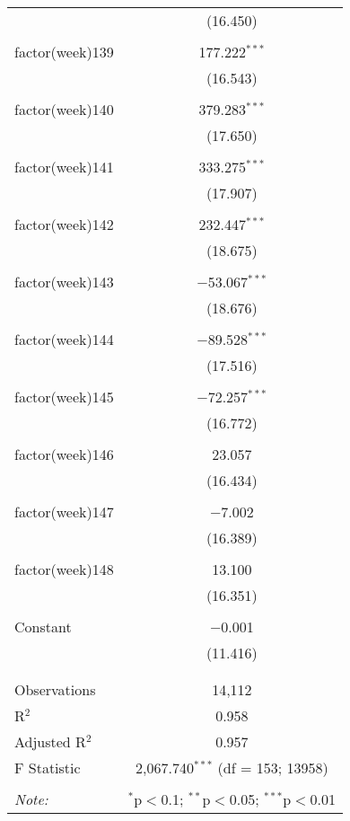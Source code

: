 \documentclass{article}
\begin{document}
\begin{table}[!htbp]
\begin{tabular}{@{\extracolsep{5pt}}lc}
  & (16.450) \\ 
  & \\ 
 factor(week)139 & 177.222$^{***}$ \\ 
  & (16.543) \\ 
  & \\ 
 factor(week)140 & 379.283$^{***}$ \\ 
  & (17.650) \\ 
  & \\ 
 factor(week)141 & 333.275$^{***}$ \\ 
  & (17.907) \\ 
  & \\ 
 factor(week)142 & 232.447$^{***}$ \\ 
  & (18.675) \\ 
  & \\ 
 factor(week)143 & $-$53.067$^{***}$ \\ 
  & (18.676) \\ 
  & \\ 
 factor(week)144 & $-$89.528$^{***}$ \\ 
  & (17.516) \\ 
  & \\ 
 factor(week)145 & $-$72.257$^{***}$ \\ 
  & (16.772) \\ 
  & \\ 
 factor(week)146 & 23.057 \\ 
  & (16.434) \\ 
  & \\ 
 factor(week)147 & $-$7.002 \\ 
  & (16.389) \\ 
  & \\ 
 factor(week)148 & 13.100 \\ 
  & (16.351) \\ 
  & \\ 
 Constant & $-$0.001 \\ 
  & (11.416) \\ 
  & \\ 
\hline \\[-1.8ex] 
Observations & 14,112 \\ 
R$^{2}$ & 0.958 \\ 
Adjusted R$^{2}$ & 0.957 \\ 
F Statistic & 2,067.740$^{***}$ (df = 153; 13958) \\ 
\hline 
\hline \\[-1.8ex] 
\textit{Note:}  & \multicolumn{1}{r}{$^{*}$p$<$0.1; $^{**}$p$<$0.05; $^{***}$p$<$0.01} \\ 
\end{tabular} 
\end{table} 
\end{document}
